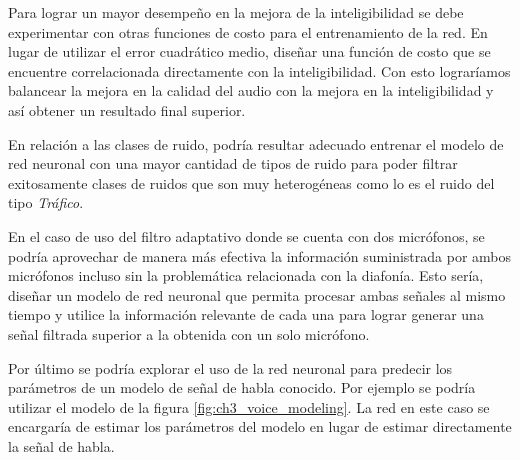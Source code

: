 Para lograr un mayor desempeño en la mejora de la inteligibilidad se debe experimentar con otras funciones de costo para el entrenamiento de la red. En lugar de utilizar el error cuadrático medio, diseñar una función de costo que se encuentre correlacionada directamente con la inteligibilidad. Con esto lograríamos balancear la mejora en la calidad del audio con la mejora en la inteligibilidad y así obtener un resultado final superior.

En relación a las clases de ruido, podría resultar adecuado entrenar el modelo de red neuronal con una mayor cantidad de tipos de ruido para poder filtrar exitosamente clases de ruidos que son muy heterogéneas como lo es el ruido del tipo \emph{Tráfico}.

En el caso de uso del filtro adaptativo donde se cuenta con dos micrófonos, se podría aprovechar de manera más efectiva la información suministrada por ambos micrófonos incluso sin la problemática relacionada con la diafonía. Esto sería, diseñar un modelo de red neuronal que permita procesar ambas señales al mismo tiempo y utilice la información relevante de cada una para lograr generar una señal filtrada superior a la obtenida con un solo micrófono.

Por último se podría explorar el uso de la red neuronal para predecir los parámetros de un modelo de señal de habla conocido. Por ejemplo se podría utilizar el modelo de la figura \ref{fig:ch3_voice_modeling}. La red en este caso se encargaría de estimar los parámetros del modelo en lugar de estimar directamente la señal de habla.
